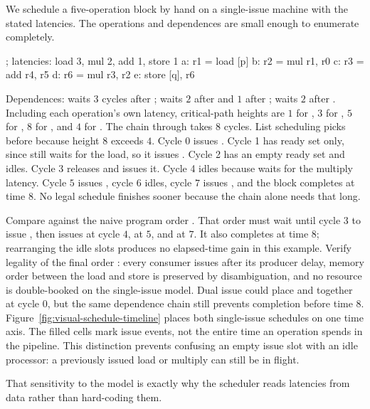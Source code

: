 We schedule a five-operation block by hand on a single-issue machine with the stated latencies.
The operations and dependences are small enough to enumerate completely.
\begin{irlisting}
; latencies: load 3, mul 2, add 1, store 1
a: r1 = load [p]
b: r2 = mul r1, r0
c: r3 = add r4, r5
d: r6 = mul r3, r2
e: store [q], r6
\end{irlisting}
Dependences:  waits $3$ cycles after ;  waits $2$ after  and $1$ after ;  waits $2$ after .
Including each operation's own latency, critical-path heights are $1$ for , $3$ for , $5$ for , $8$ for , and $4$ for .
The chain through  takes $8$ cycles.
List scheduling picks  before  because height $8$ exceeds $4$.
Cycle 0 issues .
Cycle 1 has ready set  only, since  still waits for the load, so it issues .
Cycle 2 has an empty ready set and idles.
Cycle 3 releases  and issues it.
Cycle 4 idles because  waits for the multiply latency.
Cycle $5$ issues , cycle $6$ idles, cycle $7$ issues , and the block completes at time $8$.
No legal schedule finishes sooner because the  chain alone needs that long.

Compare against the naive program order .
That order must wait until cycle $3$ to issue , then issues  at cycle $4$,  at $5$, and  at $7$.
It also completes at time $8$; rearranging the idle slots produces no elapsed-time gain in this example.
Verify legality of the final order : every consumer issues after its producer delay, memory order between the load and store is preserved by disambiguation, and no resource is double-booked on the single-issue model.
Dual issue could place  and  together at cycle $0$, but the same dependence chain still prevents completion before time $8$.
Figure~\ref{fig:visual-schedule-timeline} places both single-issue schedules on one time axis.
The filled cells mark issue events, not the entire time an operation spends in the pipeline.
This distinction prevents confusing an empty issue slot with an idle processor: a previously issued load or multiply can still be in flight.



That sensitivity to the model is exactly why the scheduler reads latencies from data rather than hard-coding them.

